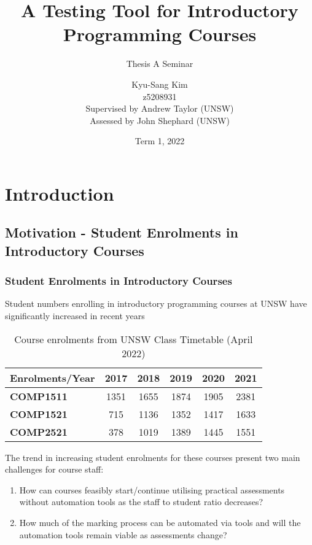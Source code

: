 \documentclass[xcolor]{beamer}
\author[Kyu-Sang Kim]{Kyu-Sang Kim\\z5208931\\\vspace{0.2cm}Supervised by Andrew Taylor (UNSW)\\Assessed by John Shephard (UNSW)}
\title[Thesis A Seminar]{A Testing Tool for Introductory Programming Courses}
\subtitle{Thesis A Seminar}
\date{Term 1, 2022}
\begin{document}
\begin{frame}
	\titlepage
\end{frame}


\section{Introduction}
\subsection{Motivation - Student Enrolments in Introductory Courses}
\begin{frame}
	\frametitle{Student Enrolments in Introductory Courses}
	Student numbers enrolling in introductory programming courses at UNSW have significantly increased in recent years\\
		\pause
	\begin{table}[h!]
		\centering
		\begin{tabular}{|l|c|c|c|c|c|}
			\hline
			\textbf{Enrolments/Year} & \textbf{2017} & \textbf{2018} & \textbf{2019} & \textbf{2020} & \textbf{2021} \\ 
			\hline
			\textbf{COMP1511} & 1351 & 1655 & 1874 & 1905 & 2381\\ 
			\hline
			\textbf{COMP1521} & 715 & 1136 & 1352 & 1417 & 1633\\
			\hline
			\textbf{COMP2521} & 378 & 1019 & 1389 & 1445 & 1551\\
			\hline
		\end{tabular}
		\caption{Course enrolments from UNSW Class Timetable (April 2022)}
		\label{table:1}
		\vspace{-4mm}
	\end{table}
		\pause
	The trend in increasing student enrolments for these courses present two main challenges for course staff:\\
		\pause
	
	\begin{enumerate}
		\item How can courses feasibly start/continue utilising practical assessments without automation tools as the staff to student ratio decreases?
			\pause
		\item How much of the marking process can be automated via tools and will the automation tools remain viable as assessments change?
	\end{enumerate}
	
\end{frame}
\end{document}
